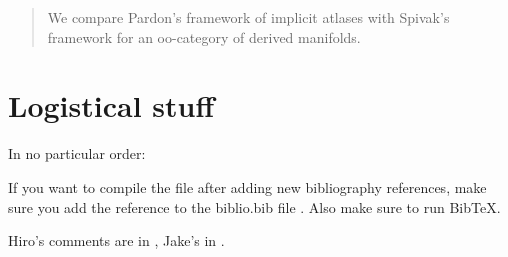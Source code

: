 \documentclass[12pt]{article}
\title{}
\author{Jacob McNamara and Hiro Lee Tanaka}
\theoremstyle{definition}
\begin{document}
\maketitle

\begin{abstract}
We compare Pardon's framework of implicit atlases with Spivak's framework for an oo-category of derived manifolds.
\end{abstract}

\section{Logistical stuff}
In no particular order:
\enum
	\item
		If you want to compile the file after adding new bibliography references, make sure you add the reference to the biblio.bib file . Also make sure to run BibTeX.
	\item
		Hiro's comments are in , Jake's in .
\enumd








\end{document}
